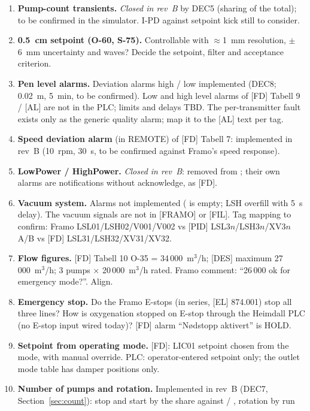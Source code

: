 \documentclass[11pt,a4paper]{article}
\begin{document}
\begin{small}
\begin{enumerate}[label=\textbf{OI\arabic*}, leftmargin=12mm, itemsep=0.5mm]
        be updated.
  \item \textbf{Pump-count transients.} \emph{Closed in rev~B} by DEC5 (sharing of the total); to be
        confirmed in the simulator. I-PD against setpoint kick still to consider.
  \item \textbf{0.5~cm setpoint (O-60, S-75).} Controllable with $\approx$1~mm resolution, $\pm$6~mm
        uncertainty and waves? Decide the setpoint, filter and acceptance criterion.
  \item \textbf{Pen level alarms.} Deviation alarms high / low implemented (DEC8; 0.02~m, 5~min, to be
        confirmed). Low and high level alarms of [FD] Tabell 9 / [AL] are not in the PLC; limits and
        delays TBD. The per-transmitter fault exists only as the generic
        quality alarm; map it to the [AL] text per tag.
  \item \textbf{Speed deviation alarm} (in REMOTE) of [FD] Tabell 7: implemented in rev~B (10~rpm, 30~s, to be
        confirmed against Framo's speed response).
  \item \textbf{LowPower / HighPower.} \emph{Closed in rev~B}: removed from ; their own
        alarms are notifications without acknowledge, as [FD].
  \item \textbf{Vacuum system.} Alarms not implemented ( is empty; LSH overfill
        with 5~s delay). The vacuum signals are not in [FRAMO] or [FIL]. Tag mapping to confirm: Framo
        LSL01/LSH02/V001/V002 vs [PID] LSL3$n$/LSH3$n$/XV3$n$A/B vs [FD] LSL31/LSH32/XV31/XV32.
  \item \textbf{Flow figures.} [FD] Tabell 10 O-35 = 34\,000~m$^3$/h; [DES] maximum 27\,000~m$^3$/h;
        3 pumps $\times$ 20\,000~m$^3$/h rated. Framo comment: ``26\,000 ok for emergency mode?''. Align.
  \item \textbf{Emergency stop.} Do the Framo E-stops (in series, [EL] 874.001) stop all three lines?
        How is oxygenation stopped on E-stop through the Heimdall PLC (no E-stop input wired today)?
        [FD] alarm ``Nødstopp aktivert'' is HOLD.
  \item \textbf{Setpoint from operating mode.} [FD]: LIC01 setpoint chosen from the mode, with manual
        override. PLC: operator-entered setpoint only; the outlet mode table has damper positions only.
  \item \textbf{Number of pumps and rotation.} Implemented in rev~B (DEC7, Section~\ref{sec:count}):
        stop and start by the share against  / , rotation by run

\end{enumerate}
\end{small}
\end{document}
